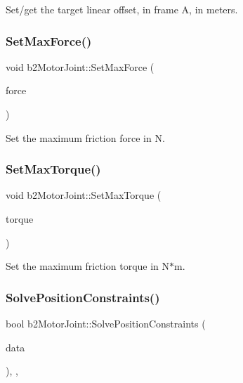 Set/get the target linear offset, in frame A, in meters. 

\mbox{\label{classb2_motor_joint_a62f95f23d60123cebe14f2fcec155801}} 
\subsubsection{\texorpdfstring{SetMaxForce()}{SetMaxForce()}}
{\footnotesize\ttfamily void b2\+Motor\+Joint\+::\+Set\+Max\+Force (\begin{DoxyParamCaption}\item[{\mbox{\hyperlink{b2_settings_8h_aacdc525d6f7bddb3ae95d5c311bd06a1}{float32}}}]{force }\end{DoxyParamCaption})}



Set the maximum friction force in N. 

\mbox{\label{classb2_motor_joint_a3e9a259d36c36e0dc078282e6799d625}} 
\subsubsection{\texorpdfstring{SetMaxTorque()}{SetMaxTorque()}}
{\footnotesize\ttfamily void b2\+Motor\+Joint\+::\+Set\+Max\+Torque (\begin{DoxyParamCaption}\item[{\mbox{\hyperlink{b2_settings_8h_aacdc525d6f7bddb3ae95d5c311bd06a1}{float32}}}]{torque }\end{DoxyParamCaption})}



Set the maximum friction torque in N$\ast$m. 

\mbox{\label{classb2_motor_joint_a4e56455ab7e90f82fc1f463efc9b59de}} 
\subsubsection{\texorpdfstring{SolvePositionConstraints()}{SolvePositionConstraints()}}
{\footnotesize\ttfamily bool b2\+Motor\+Joint\+::\+Solve\+Position\+Constraints (\begin{DoxyParamCaption}\item[{const \mbox{\hyperlink{structb2_solver_data}{b2\+Solver\+Data}} \&}]{data }\end{DoxyParamCaption})\hspace{0.3cm}{\ttfamily [override]}, {\ttfamily [protected]}, {\ttfamily [virtual]}}



